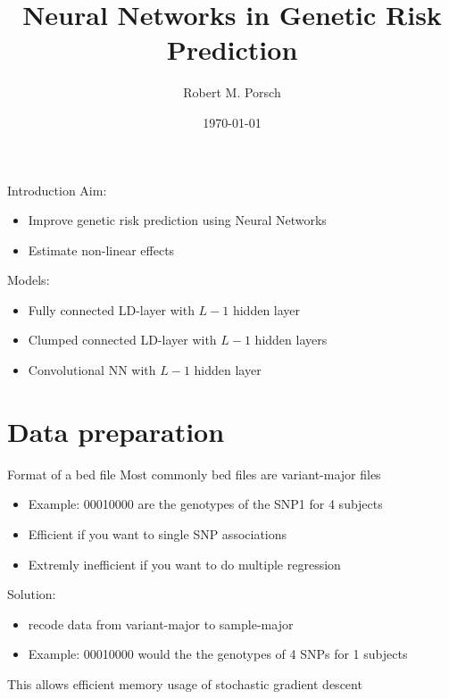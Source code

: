 \documentclass{beamer}
\title{Neural Networks in Genetic Risk Prediction}
\date{\today}
\author{Robert M. Porsch}
\institute{Center for Genomic Science}
\begin{document}
\maketitle

\begin{frame}[t]{Introduction}
  Aim:
  \begin{itemize}
    \item Improve genetic risk prediction using Neural Networks
    \item Estimate non-linear effects
  \end{itemize}
  Models:
  \begin{itemize}
    \item Fully connected LD-layer with $L-1$ hidden layer
    \item Clumped connected LD-layer with $L-1$ hidden layers
    \item Convolutional NN with $L-1$ hidden layer
  \end{itemize}
\end{frame}

\section{Data preparation}

\begin{frame}[t]{Format of a bed file}
  Most commonly bed files are variant-major files
  \begin{itemize}
    \item Example: 00010000 are the genotypes of the SNP1 for 4 subjects
    \item Efficient if you want to single SNP associations
    \item Extremly inefficient if you want to do multiple regression
  \end{itemize}
  Solution:
  \begin{itemize}
    \item recode data from variant-major to sample-major
    \item Example: 00010000 would the the genotypes of 4 SNPs for 1 subjects
  \end{itemize}
  This allows efficient memory usage of stochastic gradient descent
\end{frame}
\end{document}
